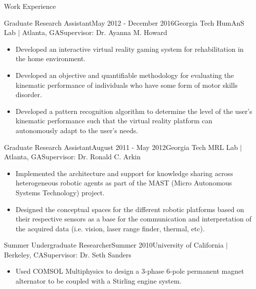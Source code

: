 \documentclass{resume} %
\begin{document}
\begin{rSection}{Work Experience}
\begin{rSubsection}{Graduate Research Assistant}{May 2012 - December 2016}{Georgia Tech HumAnS Lab $\vert$ Atlanta, GA}{Supervisor: Dr. Ayanna M. Howard}
\item
\begin{itemize}
\item Developed an interactive virtual reality gaming system for rehabilitation
  in the home environment.

\item Developed an objective and quantifiable methodology for evaluating the
  kinematic performance of individuals who have some form of motor skills
  disorder.

\item Developed a pattern recognition algorithm to determine the level of the
  user's kinematic performance such that the virtual reality platform can
  autonomously adapt to the user's needs.

\end{itemize}

\end{rSubsection}


\begin{rSubsection}{Graduate Research Assistant}{August 2011 - May 2012}{Georgia Tech MRL Lab $\vert$ Atlanta, GA}{Supervisor: Dr. Ronald C. Arkin}

\item
\begin{itemize}

\item Implemented the architecture and support for knowledge sharing across
  heterogeneous robotic agents as part of the MAST (Micro Autonomous Systems
  Technology) project.

\item Designed the conceptual spaces for the different robotic platforms based
  on their respective sensors as a base for the communication and interpretation
  of the acquired data (i.e. vision, laser range finder, thermal, etc).

\end{itemize}

\end{rSubsection}


\iffalse
\begin{rSubsection}{Summer Undergraduate Researcher}{Summer 2010}{University of California $\vert$ Berkeley, CA}{Supervisor: Dr. Seth Sanders}

\item
\begin{itemize}
\item Used COMSOL Multiphysics to design a 3-phase 6-pole permanent magnet
  alternator to be coupled with a Stirling engine system.
\end{itemize}


\end{rSubsection}
\end{rSection}
\end{document}
